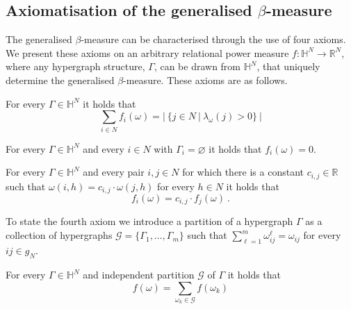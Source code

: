 \begin{subappendices}
\section{Axiomatisation of the generalised $\beta$-measure}
\label{BetaAxiomatisation}

The generalised $\beta$-measure can be characterised through the use of four axioms. We present these axioms on an arbitrary relational power measure $f : \mathbb{H}^{N} \rightarrow \mathbb{R}^{N}$, where any hypergraph structure, $\Gamma$, can be drawn from $\mathbb{H}^{N}$, that uniquely determine the generalised $\beta$-measure. These axioms are as follows.

\begin{axiom} \label{ax:1}
For every $\Gamma \in \mathbb{H}^{N}$ it holds that
\[
\sum_{i \in N} f_{i}(\omega) = | ~ \{ j \in N ~ | ~ \lambda_{\omega}(j) > 0 \} ~ |
\]
\end{axiom}

\begin{axiom} \label{ax:2}
For every $\Gamma \in \mathbb{H}^{N}$ and every $i \in N$ with $\Gamma_{i} = \varnothing$ it holds that $f_{i}(\omega) = 0$.
\end{axiom}

\begin{axiom} \label{ax:3}
For every $\Gamma \in \mathbb{H}^{N}$ and every pair $i,j \in N$ for which there is a constant $c_{i,j} \in \mathbb{R}$ such that $\omega(i,h) = c_{i,j} \cdot \omega(j,h)$ for every $h \in N$ it holds that
\begin{equation}
f_{i}(\omega) = c_{i,j} \cdot f_{j}(\omega) ~ .
\end{equation}
\end{axiom}

To state the fourth axiom we introduce a partition of a hypergraph $\Gamma$ as a collection of hypergraphs $\mathcal{G} = \{\Gamma_{1}, \ldots, \Gamma_{m}\}$ such that $\sum_{\ell = 1}^{m} \omega_{ij}^{\ell} = \omega_{ij}$ for every $ij \in g_{N}$.


\begin{axiom} \label{ax:4}
For every $\Gamma \in \mathbb{H}^{N}$ and independent partition $\mathcal{G}$ of $\Gamma$ it holds that
\begin{equation}
f(\omega) = \sum_{\omega_{k} \in \mathcal{G}} f(\omega_{k})
\end{equation}
\end{axiom}


\end{subappendices}
